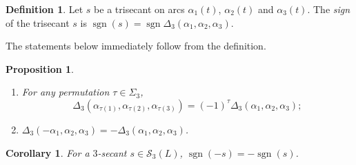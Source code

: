 \documentclass{article}
\newtheorem{corollary}{Corollary}
\newtheorem{proposition}{Proposition}
\theoremstyle{definition}
\newtheorem{definition}{Definition}
\theoremstyle{remark}
\DeclareMathOperator{\sgn}{\mathrm{sgn}}
\begin{document}
\begin{definition}\label{def:3secant_sign}
Let $s$ be a trisecant on arcs $\alpha_1(t)$, $\alpha_2(t)$ and $\alpha_3(t)$. The \emph{sign} of the trisecant $s$ is $\sgn(s)=\sgn\Delta_3(\alpha_1,\alpha_2,\alpha_3)$.
\end{definition}

The statements below immediately follow from the definition.
\begin{proposition}\label{prop:3secant_delta}
\begin{enumerate}
    \item For any permutation $\tau\in\Sigma_3$,
\[
\Delta_3(\alpha_{\tau(1)},\alpha_{\tau(2)},\alpha_{\tau(3)})=(-1)^\tau\Delta_3(\alpha_1,\alpha_2,\alpha_3);
\]
    \item $\Delta_3(-\alpha_1,\alpha_2,\alpha_3)=-\Delta_3(\alpha_1,\alpha_2,\alpha_3)$.

\end{enumerate}
\end{proposition}

\begin{corollary}\label{cor:3secant_inverse_sign}
    For a $3$-secant $s\in\mathcal S_3(L)$, $\sgn(-s)=-\sgn(s)$.
\end{corollary}
\end{document}
